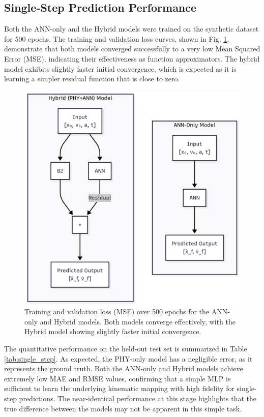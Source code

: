 \documentclass[conference]{IEEEtran}
\begin{document}
\subsection{Single-Step Prediction Performance}
Both the ANN-only and the Hybrid models were trained on the synthetic dataset for 500 epochs. The training and validation loss curves, shown in Fig. \ref{fig:loss}, demonstrate that both models converged successfully to a very low Mean Squared Error (MSE), indicating their effectiveness as function approximators. The hybrid model exhibits slightly faster initial convergence, which is expected as it is learning a simpler residual function that is close to zero.

\begin{figure}[htbp]
\centerline{\includegraphics[width=\columnwidth]{figure1.png}}
\caption{Training and validation loss (MSE) over 500 epochs for the ANN-only and Hybrid models. Both models converge effectively, with the Hybrid model showing slightly faster initial convergence.}
\label{fig:loss}
\end{figure}

The quantitative performance on the held-out test set is summarized in Table \ref{tab:single_step}. As expected, the PHY-only model has a negligible error, as it represents the ground truth. Both the ANN-only and Hybrid models achieve extremely low MAE and RMSE values, confirming that a simple MLP is sufficient to learn the underlying kinematic mapping with high fidelity for single-step predictions. The near-identical performance at this stage highlights that the true difference between the models may not be apparent in this simple task.
\end{document}
